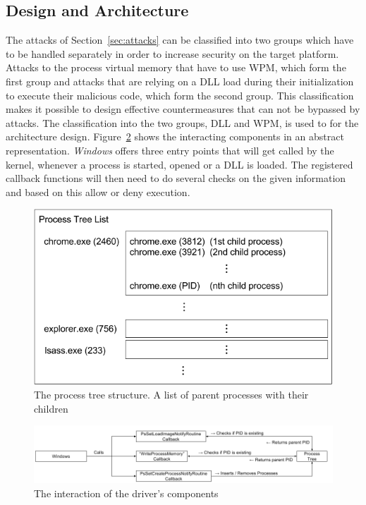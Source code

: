 \subsection{Design and Architecture}
The attacks of Section~\ref{sec:attacks} can be classified into two groups which have to be handled separately in order to increase security on the target platform. Attacks to the process virtual memory that have to use \gls{WPM}, which form the first group and attacks that are relying on a \gls{DLL} load during their initialization to execute their malicious code, which form the second group. This classification makes it possible to design effective countermeasures that can not be bypassed by attacks. The classification into the two groups, \gls{DLL} and \gls{WPM}, is used to for the architecture design. Figure~\ref{fig:interaction} shows the interacting components in an abstract representation. \emph{Windows} offers three entry points that will get called by the kernel, whenever a process is started, opened or a \gls{DLL} is loaded. The registered callback functions will then need to do several checks on the given information and based on this allow or deny execution.
\begin{figure}[h]
\centering
\includegraphics[scale=0.6]{sections/implementation/listoflists.png}
\caption{The process tree structure. A list of parent processes with their children}
\label{fig:listoflists}
\end{figure}
\begin{figure}[!p]
\centering
\includegraphics[angle=90,scale=0.6]{sections/implementation/interaction.png}
\caption{The interaction of the driver's components}
\label{fig:interaction}
\end{figure}
